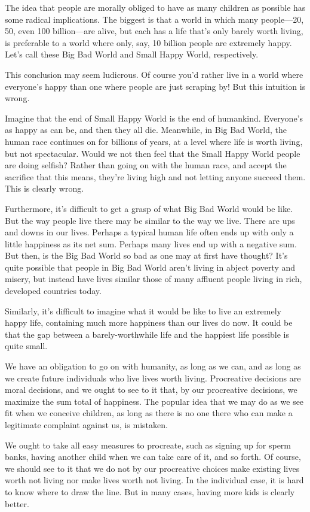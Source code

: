 \documentclass[9pt]{article}
\begin{document}
The idea that people are morally obliged to have as many children as
possible has some radical implications. The biggest is that a world in
which many people---20, 50, even 100 billion---are alive, but each has a
life that's only barely worth living, is preferable to a world where
only, say, 10 billion people are extremely happy. Let's call these Big
Bad World and Small Happy World, respectively.

This conclusion may seem ludicrous. Of course you'd rather live in a
world where everyone's happy than one where people are just scraping by!
But this intuition is wrong.

Imagine that the end of Small Happy World is the end of humankind.
Everyone's as happy as can be, and then they all die. Meanwhile, in Big
Bad World, the human race continues on for billions of years, at a level
where life is worth living, but not spectacular. Would we not then feel
that the Small Happy World people are doing selfish? Rather than going
on with the human race, and accept the sacrifice that this means,
they're living high and not letting anyone succeed them. This is clearly
wrong.

Furthermore, it's difficult to get a grasp of what Big Bad World would
be like. But the way people live there may be similar to the way we
live. There are ups and downs in our lives. Perhaps a typical human life
often ends up with only a little happiness as its net sum. Perhaps many
lives end up with a negative sum. But then, is the Big Bad World so bad
as one may at first have thought? It's quite possible that people in Big
Bad World aren't living in abject poverty and misery, but instead have
lives similar those of many affluent people living in rich, developed
countries today.

Similarly, it's difficult to imagine what it would be like to live an
extremely happy life, containing much more happiness than our lives do
now. It could be that the gap between a barely-worthwhile life and the
happiest life possible is quite small.

We have an obligation to go on with humanity, as long as we can, and as
long as we create future individuals who live lives worth living.
Procreative decisions are moral decisions, and we ought to see to it
that, by our procreative decisions, we maximize the sum total of
happiness. The popular idea that we may do as we see fit when we
conceive children, as long as there is no one there who can make a
legitimate complaint against us, is mistaken.

We ought to take all easy measures to procreate, such as signing up for
sperm banks, having another child when we can take care of it, and so
forth. Of course, we should see to it that we do not by our procreative
choices make existing lives worth not living nor make lives worth not
living. In the individual case, it is hard to know where to draw the
line. But in many cases, having more kids is clearly better.
\end{document}
